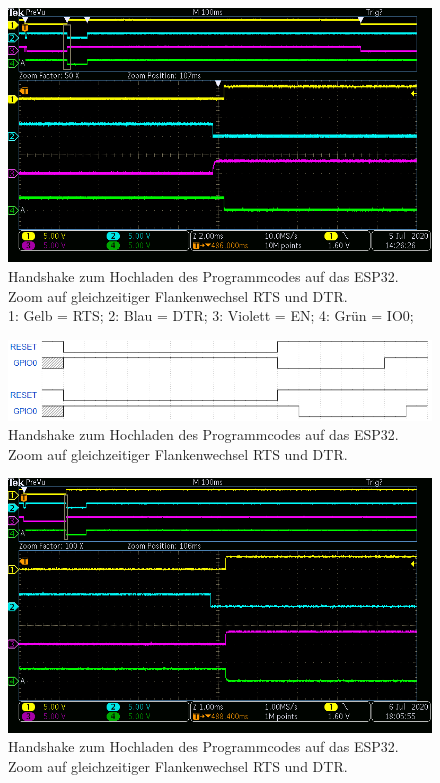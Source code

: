 \begin{figure}[H]
\center
\includegraphics[width = \textwidth]{graphics/ESP32_RTS_DTR_EN_IO0_2}
\caption{Handshake zum Hochladen des Programmcodes auf das ESP32. Zoom auf gleichzeitiger Flankenwechsel RTS und DTR.\\\hspace{\textwidth}1: Gelb = RTS; 2: Blau = DTR; 3: Violett = EN; 4: Grün = IO0;}
\label{fig:ESP32_RTS_DTR_EN_IO0_2}
\end{figure}

\newpage

\begin{figure}[H]
\center
\includegraphics[width = \textwidth]{graphics/ESP32_Handshake_Forum}
\caption{Handshake zum Hochladen des Programmcodes auf das ESP32. Zoom auf gleichzeitiger Flankenwechsel RTS und DTR.}
\label{fig:ESP32_Handshake_Forum}
\end{figure}

\begin{figure}[H]
\center
\includegraphics[width = \textwidth]{graphics/ESP32_RTS_DTR_EN_IO0_mit_Bruecke_1}
\caption{Handshake zum Hochladen des Programmcodes auf das ESP32. Zoom auf gleichzeitiger Flankenwechsel RTS und DTR.}
\label{fig:ESP32_RTS_DTR_EN_IO0_mit_Bruecke_1}
\end{figure}


